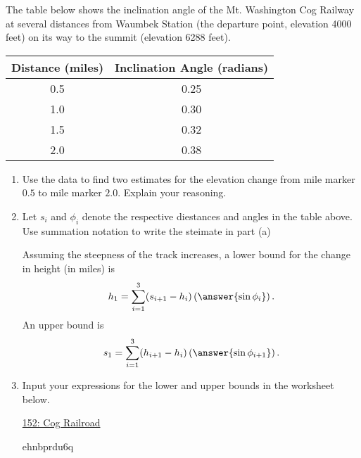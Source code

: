 \documentclass{ximera}
\begin{document}
\begin{exercise}  \label{EX:MnVWeDF3x}
The table below shows the inclination angle of the Mt. Washington Cog Railway at several distances from Waumbek Station (the departure point, elevation 4000 feet) on its way to the summit (elevation 6288 feet).

\begin{tabular}{|c|c|}
\hline
Distance (miles) & Inclination Angle (radians) \\
\hline
0.5 & 0.25 \\  \hline
1.0 & 0.30 \\ \hline
1.5 & 0.32 \\ \hline
2.0 & 0.38  \\ \hline
\hline
\end{tabular}


\begin{enumerate}
\item Use the data to find two estimates for the elevation change from mile marker $0.5$ to mile marker $2.0$. Explain your reasoning.

\item Let $s_i$ and $\phi_i$ denote the respective diestances and angles in the table above. Use summation notation to write the steimate in part (a)


Assuming the steepness of the track increases, a lower bound for the change in height (in miles) is
\[
    h_1 = \sum_{i=1}^3 (s_{i+1}-h_{i}) \left( \answer{\sin \phi_i} \right)  .
\]
An upper bound is
\[
    s_1 = \sum_{i=1}^3(h_{i+1}-h_{i}) \left( \answer{\sin \phi_{i+1}} \right)  .
\]

\item Input your expressions for the lower and upper bounds in the worksheet below.

\begin{onlineOnly}
    \begin{center}
\end{center}
\end{onlineOnly}

\href{https://www.desmos.com/calculator/ehnbprdu6q}{152: Cog Railroad}



ehnbprdu6q

\end{enumerate}
\end{exercise}
\end{document}
